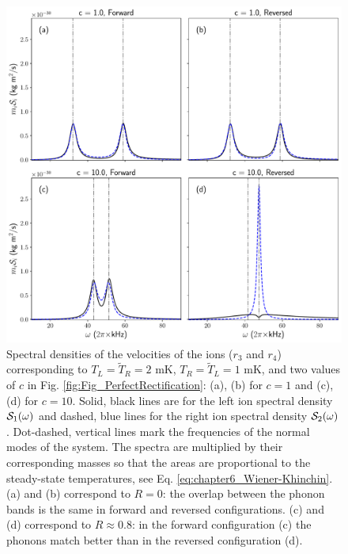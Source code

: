 \begin{figure}[t]
  \center
  \includegraphics[width=0.75\linewidth]{Figures/SpectrumComparative.pdf}
  \caption{Spectral densities of the velocities of the ions ($r_3$ and $r_4$) corresponding to $T_L=\tilde{T}_R=2$ mK, $T_R=\tilde{T}_L=1$ mK, and  two values of $c$ in Fig. \ref{fig:Fig_PerfectRectification}: (a), (b) for $c=1$ and (c), (d) for $c=10$. Solid, black lines are for the left ion spectral density ${\cal{S}}_1(\omega)$ and dashed, blue lines for the right ion spectral density
 ${\cal{S}}_2(\omega)$. Dot-dashed, vertical lines mark the frequencies of the normal modes of the system. The spectra are multiplied by their corresponding masses so that  the areas are proportional to the steady-state temperatures, see  Eq. \eqref{eq:chapter6_Wiener-Khinchin}. (a) and (b) correspond to $R = 0$:  the overlap between the phonon bands is the same in forward and reversed configurations. (c) and (d) correspond to $R\approx 0.8$:  in the forward configuration (c)  the phonons match better than in the reversed configuration (d).}
  \label{fig:Figure_Spectra}
\end{figure}

